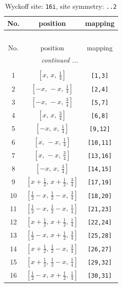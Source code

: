 \documentclass[fleqn,8pt]{jsarticle}
\begin{document}
\begin{longtable}{ccc}
\caption{Wyckoff site: {\tt 16i}, site symmetry: {\tt ..2}}
 \\
 \hline \hline
No. & position & mapping \\ \hline \endfirsthead

\multicolumn{2}{l}{\tablename\ \thetable{}} \\
 \hline \hline
No. & position & mapping \\ \hline \endhead

 \hline \hline
\multicolumn{2}{r}{\footnotesize\it continued ...} \\ \endfoot

 \hline \hline
\multicolumn{2}{r}{} \\ \endlastfoot

1 & $\left[ x,\, x,\, \frac{1}{4} \right]$ & {\tt [1,3]} \\ \hline
2 & $\left[ - x,\, - x,\, \frac{1}{4} \right]$ & {\tt [2,4]} \\ \hline
3 & $\left[ - x,\, - x,\, \frac{3}{4} \right]$ & {\tt [5,7]} \\ \hline
4 & $\left[ x,\, x,\, \frac{3}{4} \right]$ & {\tt [6,8]} \\ \hline
5 & $\left[ - x,\, x,\, \frac{1}{4} \right]$ & {\tt [9,12]} \\ \hline
6 & $\left[ x,\, - x,\, \frac{1}{4} \right]$ & {\tt [10,11]} \\ \hline
7 & $\left[ x,\, - x,\, \frac{3}{4} \right]$ & {\tt [13,16]} \\ \hline
8 & $\left[ - x,\, x,\, \frac{3}{4} \right]$ & {\tt [14,15]} \\ \hline
9 & $\left[ x + \frac{1}{2},\, x + \frac{1}{2},\, \frac{3}{4} \right]$ & {\tt [17,19]} \\ \hline
10 & $\left[ \frac{1}{2} - x,\, \frac{1}{2} - x,\, \frac{3}{4} \right]$ & {\tt [18,20]} \\ \hline
11 & $\left[ \frac{1}{2} - x,\, \frac{1}{2} - x,\, \frac{1}{4} \right]$ & {\tt [21,23]} \\ \hline
12 & $\left[ x + \frac{1}{2},\, x + \frac{1}{2},\, \frac{1}{4} \right]$ & {\tt [22,24]} \\ \hline
13 & $\left[ \frac{1}{2} - x,\, x + \frac{1}{2},\, \frac{3}{4} \right]$ & {\tt [25,28]} \\ \hline
14 & $\left[ x + \frac{1}{2},\, \frac{1}{2} - x,\, \frac{3}{4} \right]$ & {\tt [26,27]} \\ \hline
15 & $\left[ x + \frac{1}{2},\, \frac{1}{2} - x,\, \frac{1}{4} \right]$ & {\tt [29,32]} \\ \hline
16 & $\left[ \frac{1}{2} - x,\, x + \frac{1}{2},\, \frac{1}{4} \right]$ & {\tt [30,31]} \\
\end{longtable}
\end{document}

